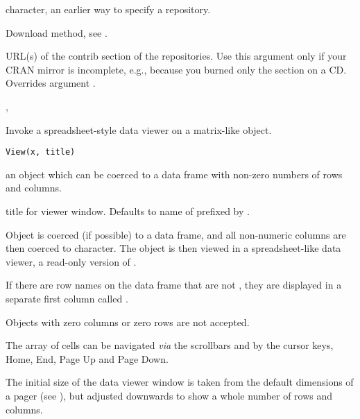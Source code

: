 %
\begin{Arguments}
\begin{ldescription}
\item[\code{CRAN}] character, an earlier way to specify a repository.
\item[\code{method}] Download method, see .
\item[\code{contriburl}] URL(s) of the contrib section of the
repositories. Use this argument only if your CRAN mirror is
incomplete, e.g., because you burned only the  section on a
CD.  Overrides argument .
 
\end{ldescription}
\end{Arguments}
%
\begin{SeeAlso}\relax
{}, 
\end{SeeAlso}
%
\begin{Description}\relax
Invoke a spreadsheet-style data viewer on a matrix-like \R{} object.
\end{Description}
%
\begin{Usage}
\begin{verbatim}
View(x, title)
\end{verbatim}
\end{Usage}
%
\begin{Arguments}
\begin{ldescription}
\item[\code{x}] an \R{} object which can be coerced to a data frame with
non-zero numbers of rows and columns.
\item[\code{title}] title for viewer window.  Defaults to name of 
prefixed by .
\end{ldescription}
\end{Arguments}
%
\begin{Details}\relax
Object  is coerced (if possible) to a data frame, and all
non-numeric columns are then coerced to character.   The object is
then viewed in a spreadsheet-like data viewer, a read-only version of
.

If there are row names on the data frame that are not ,
they are displayed in a separate first column called .

Objects with zero columns or zero rows are not accepted.

The array of cells can be navigated \emph{via} the scrollbars and
by the cursor keys, Home, End, Page Up and Page Down.

The initial size of the data viewer window is taken from the default
dimensions of a pager (see ), but adjusted
downwards to show a whole number of rows and columns.  
\end{Details}
